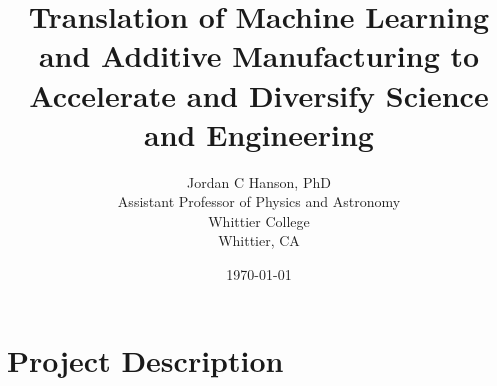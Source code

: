 \documentclass[10pt,twoside,openany]{book}
\title{Translation of Machine Learning and Additive Manufacturing to Accelerate and Diversify Science and Engineering}
\author{Jordan C Hanson, PhD \\ Assistant Professor of Physics and Astronomy \\ Whittier College \\ Whittier, CA}
\date{\today}
\begin{document}
\begin{flushleft}

\end{flushleft}

\begin{flushleft}

\end{flushleft}

\maketitle
\tableofcontents

\chapter{Project Description}
\begin{flushleft}

\end{flushleft}

%
%
%
%
%
%
%

\small


 
\end{document}
